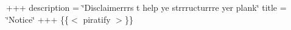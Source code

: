 +++ description = \char`\"{}\+Disclaimerrrs t\textquotesingle{} help ye strrructurrre yer plank\char`\"{} title = \char`\"{}\+Notice\char`\"{} +++ \{\{$<$ piratify $>$\}\} 